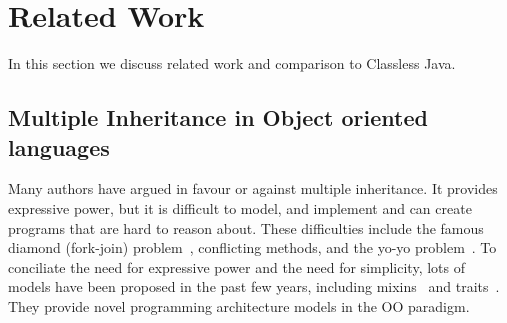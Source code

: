 \section{Related Work}\label{sec:related}
In this section we discuss related work and comparison to Classless Java.






\subsection{Multiple Inheritance in Object oriented languages}
Many authors have argued in favour or against multiple inheritance.  It provides
expressive power, but it is difficult to model, and implement and can create
programs that are hard to reason about.  These difficulties include the famous
diamond (fork-join) problem~\cite{bracha90mixin,Sak89dis}, conflicting methods,
and the yo-yo problem~\cite{taenzer1989problems}.  To conciliate the need for
expressive power and the need for simplicity, lots of models have been proposed
in the past few years, including mixins~\cite{bracha90mixin} and
traits~\cite{scharli03traits}.  They provide novel programming architecture
models in the OO paradigm.

